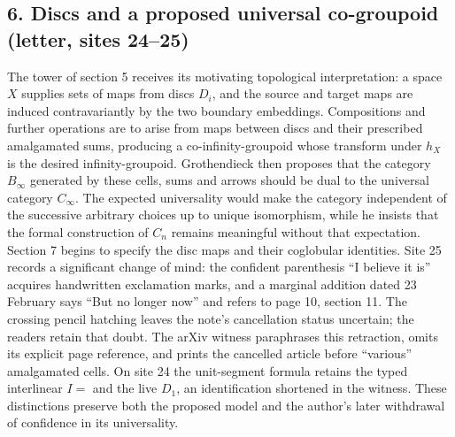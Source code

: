 \documentclass[10pt,oneside]{book}
\begin{document}
\subsection*{6. Discs and a proposed universal co-groupoid (letter, sites 24--25)}
The tower of section 5 receives its motivating topological interpretation: a space $X$ supplies sets of maps from discs $D_i$, and the source and target maps are induced contravariantly by the two boundary embeddings. Compositions and further operations are to arise from maps between discs and their prescribed amalgamated sums, producing a co-infinity-groupoid whose transform under $h_X$ is the desired infinity-groupoid. Grothendieck then proposes that the category $B_\infty$ generated by these cells, sums and arrows should be dual to the universal category $C_\infty$. The expected universality would make the category independent of the successive arbitrary choices up to unique isomorphism, while he insists that the formal construction of $C_n$ remains meaningful without that expectation. Section 7 begins to specify the disc maps and their coglobular identities. Site 25 records a significant change of mind: the confident parenthesis ``I believe it is'' acquires handwritten exclamation marks, and a marginal addition dated 23 February says ``But no longer now'' and refers to page 10, section 11. The crossing pencil hatching leaves the note's cancellation status uncertain; the readers retain that doubt. The arXiv witness paraphrases this retraction, omits its explicit page reference, and prints the cancelled article before ``various'' amalgamated cells. On site 24 the unit-segment formula retains the typed interlinear $I=$ and the live $D_1$, an identification shortened in the witness. These distinctions preserve both the proposed model and the author's later withdrawal of confidence in its universality.
\end{document}
